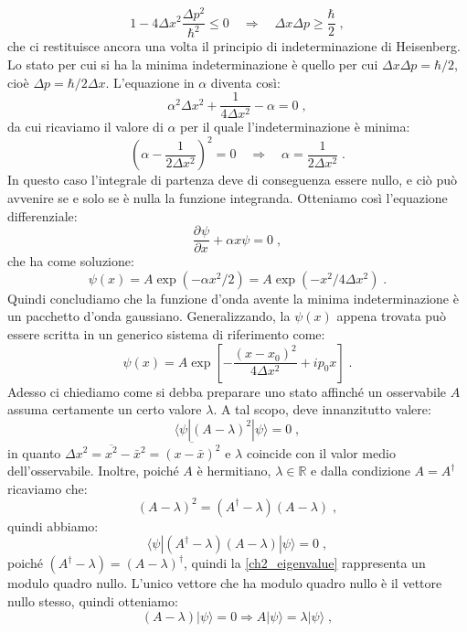 \documentclass[10pt,a4paper]{report}
\theoremstyle{definition}
\newcommand{\pdev}[3][]{\frac{\partial^{#1} #2}{\partial #3^{#1}}}
\numberwithin{equation}{section}
\newcommand{\bra}{\langle}
\newcommand{\ket}{\rangle}
\begin{document}
 \begin{equation}
  1-4\Delta x^2\frac{\Delta p^2}{\hbar^2} \le 0 \quad \Longrightarrow\quad  \Delta x\Delta p\ge \frac{\hbar}{2}\;,
 \end{equation}
 che ci restituisce ancora una volta il principio di indeterminazione di Heisenberg. Lo stato per cui si ha la minima indeterminazione è 
 quello per cui $\Delta x\Delta p=\hbar/2$, cioè $\Delta p=\hbar/2\Delta x$. L'equazione in $\alpha$ diventa così:
 $$
 \alpha^2\Delta x^2+\frac{1}{4\Delta x^2}-\alpha=0\;,
 $$
 da cui ricaviamo il valore di $\alpha$ per il quale l'indeterminazione è minima:
 $$
 \left(\alpha-\frac{1}{2\Delta x^2}\right)^2=0\quad \Longrightarrow\quad \alpha=\frac{1}{2\Delta x^2}\;.
 $$
 In questo caso l'integrale di partenza deve di conseguenza essere nullo, e ciò può avvenire se e solo se è nulla la funzione integranda. Otteniamo così l'equazione differenziale:
 \begin{equation}
  \pdev{\psi}{x}+\alpha x \psi=0\;,
 \end{equation}
 che ha come soluzione:
 $$
 \psi(x)=A\exp(-\alpha x^2/2)=A\exp(-x^2/4\Delta x^2)\;.
 $$
Quindi concludiamo che la funzione d'onda avente la minima indeterminazione è un pacchetto d'onda gaussiano. Generalizzando, la $\psi(x)$ appena trovata può essere scritta in un generico sistema di riferimento come:
$$
\psi(x)=A\exp\left[-\frac{(x-x_0)^2}{4\Delta x^2}+ip_0 x\right]\;.
$$
Adesso ci chiediamo come si debba preparare uno stato affinché un osservabile $A$ assuma certamente un certo valore $\lambda$. 
A tal scopo, deve innanzitutto valere:
\begin{equation}
 \bra \psi|(A-\lambda)^2|\psi\ket=0\;, \label{ch2_eigenvalue}
\end{equation}
in quanto $\Delta x^2=\overline{x^2}-\bar{x}^2=\overline{(x-\bar{x})^2}$ e $\lambda$ coincide con il valor medio dell'osservabile. 
Inoltre, poiché $A$ è hermitiano, $\lambda\in\mathbb{R}$ e dalla condizione $A=A^{\dagger}$ ricaviamo che:
$$
(A-\lambda)^2=(A^{\dagger}-\lambda)(A-\lambda)\;,
$$
quindi abbiamo:
\begin{equation}
 \bra \psi|(A^{\dagger}-\lambda)(A-\lambda)|\psi\ket=0\;,
\end{equation}
poiché $(A^{\dagger}-\lambda)=(A-\lambda)^{\dagger}$, quindi la \eqref{ch2_eigenvalue} rappresenta un modulo quadro nullo. L'unico vettore che ha modulo quadro nullo è il vettore nullo stesso, quindi otteniamo:
\begin{equation}
 (A-\lambda)|\psi\ket=0 \Longrightarrow A|\psi\ket=\lambda|\psi\ket\;,
\end{equation}
\end{document}
